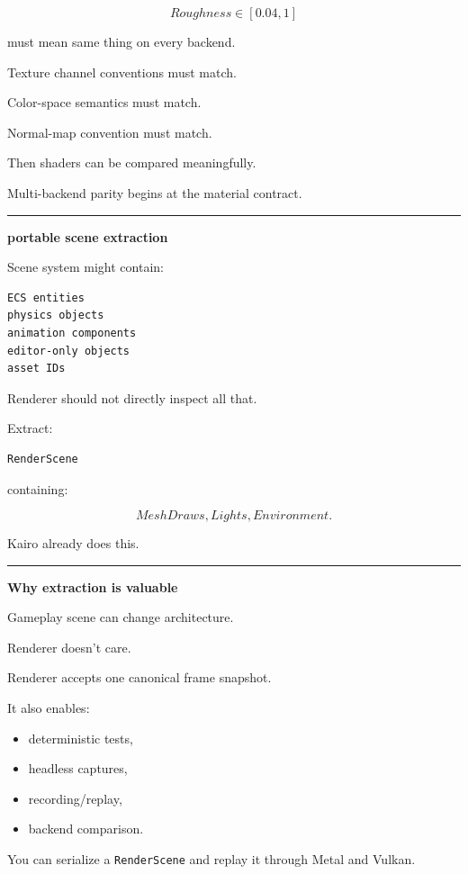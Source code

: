 \[
Roughness\in[0.04,1]
\]

must mean same thing on every backend.

Texture channel conventions must match.

Color-space semantics must match.

Normal-map convention must match.

Then shaders can be compared meaningfully.

Multi-backend parity begins at the material contract.

\begin{center}\rule{0.5\linewidth}{0.5pt}\end{center}

\textbf{portable scene extraction}

Scene system might contain:

\begin{verbatim}
ECS entities
physics objects
animation components
editor-only objects
asset IDs
\end{verbatim}

Renderer should not directly inspect all that.

Extract:

\begin{verbatim}
RenderScene
\end{verbatim}

containing:

\[
MeshDraws,
Lights,
Environment.
\]

Kairo already does this.

\begin{center}\rule{0.5\linewidth}{0.5pt}\end{center}

\textbf{Why extraction is valuable}

Gameplay scene can change architecture.

Renderer doesn't care.

Renderer accepts one canonical frame snapshot.

It also enables:

\begin{itemize}
\tightlist
\item
  deterministic tests,
\item
  headless captures,
\item
  recording/replay,
\item
  backend comparison.
\end{itemize}

You can serialize a \texttt{RenderScene} and replay it through Metal and Vulkan.

